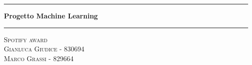 \begin{titlepage}
	\begin{center}
		
		\vspace*{1.5cm}
		\hrule
		\vspace{0.5cm}
		\huge{\bfseries
			Progetto Machine Learning
		}
		\vspace{0.5cm}
		\hrule
		
		\vspace{1.5cm}
		
		\textsc{\huge Spotify award}\\[1.5cm]
		
		\raggedleft
		\vspace*{\fill}
		{\Large\textsc{{Gianluca Giudice} - 830694}}\\
		{\Large\textsc{{Marco Grassi} - 829664}}\\
		\vspace*{3cm}
	
	\end{center}
\end{titlepage}
